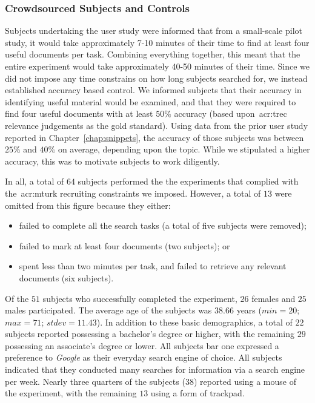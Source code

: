 \subsubsection{Crowdsourced Subjects and Controls}
Subjects undertaking the user study were informed that from a small-scale pilot study, it would take approximately 7-10 minutes of their time to find at least four useful documents per task. Combining everything together, this meant that the entire experiment would take approximately 40-50 minutes of their time. Since we did not impose any time constrains on how long subjects searched for, we instead established accuracy based control. We informed subjects that their accuracy in identifying useful material would be examined, and that they were required to find four useful documents with at least $50\%$ accuracy (based upon~\gls{acr:trec} relevance judgements as the gold standard). Using data from the prior user study reported in Chapter~\ref{chap:snippets}, the accuracy of those subjects was between $25\%$ and $40\%$ on average, depending upon the topic. While we stipulated a higher accuracy, this was to motivate subjects to work diligently.

In all, a total of $64$ subjects performed the the experiments that complied with the~\gls{acr:mturk} recruiting constraints we imposed. However, a total of $13$ were omitted from this figure because they either:

\begin{itemize}
    \item{failed to complete all the search tasks (a total of five subjects were removed);}
    \item{failed to mark at least four documents (two subjects); or}
    \item{spent less than two minutes per task, and failed to retrieve any relevant documents (six subjects).}
\end{itemize}

Of the $51$ subjects who successfully completed the experiment, $26$ females and $25$ males participated. The average age of the subjects was $38.66$ years ($min=20$; $max=71$; $stdev=11.43$). In addition to these basic demographics, a total of $22$ subjects reported possessing a bachelor's degree or higher, with the remaining $29$ possessing an associate's degree or lower. All subjects bar one expressed a preference to \emph{Google} as their everyday search engine of choice. All subjects indicated that they conducted many searches for information via a search engine per week. Nearly three quarters of the subjects ($38$) reported using a mouse of the experiment, with the remaining $13$ using a form of trackpad.

